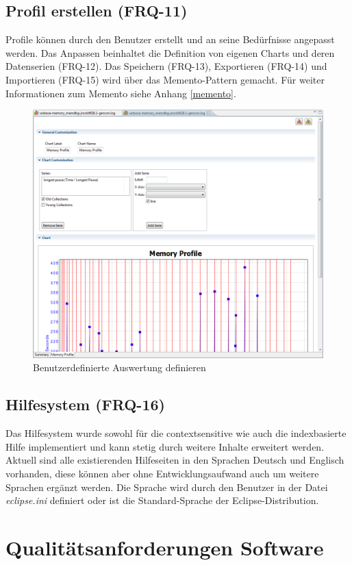 \subsection{Profil erstellen (FRQ-11)}
Profile können durch den Benutzer erstellt und an seine Bedürfnisse angepasst werden. Das Anpassen beinhaltet die Definition von eigenen Charts und deren Datenserien (FRQ-12). Das Speichern (FRQ-13), Exportieren (FRQ-14) und Importieren (FRQ-15) wird über das Memento-Pattern gemacht. Für weiter Informationen zum Memento siehe Anhang \ref{memento}.
 \begin{figure}[H]
  	\centering
    	\includegraphics[width=15cm]{images/tutorial_custom_report}
        	\caption{Benutzerdefinierte Auswertung definieren}
\end{figure}

\subsection{Hilfesystem (FRQ-16)}
Das Hilfesystem wurde sowohl für die contextsensitive wie auch die indexbasierte Hilfe implementiert und kann stetig durch weitere Inhalte erweitert werden. Aktuell sind alle existierenden Hilfeseiten in den Sprachen Deutsch und Englisch vorhanden, diese können aber ohne Entwicklungsaufwand auch um weitere Sprachen ergänzt werden. Die Sprache wird durch den Benutzer in der Datei \textit{eclipse.ini} definiert oder ist die Standard-Sprache der Eclipse-Distribution.

\section{Qualitätsanforderungen Software}

